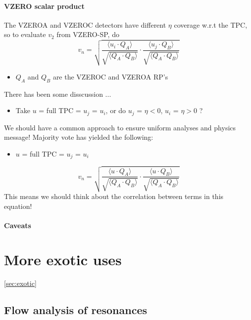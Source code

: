 \documentclass[a4paper]{book}
\numberwithin{equation}{subsection}
\begin{document}
		\subsubsection{VZERO scalar product}
		
The VZEROA and VZEROC detectors have different $\eta$ coverage w.r.t the TPC, so to evaluate $v_2$ from VZERO-SP, do
\begin{equation}
v_n = \sqrt{\frac{\langle u_i \cdotp Q_A \rangle }{\sqrt{\langle Q_A \cdotp Q_B \rangle}} \cdotp \frac{\langle u_j \cdotp Q_B \rangle }{\sqrt{\langle Q_A \cdotp Q_B \rangle}}}
\nonumber
\end{equation}
\begin{itemize}
\item $Q_A$ and $Q_B$ are the VZEROC and VZEROA RP's
\end{itemize}
There has been some disscussion ...
\begin{itemize}
\item Take $u$ = full TPC = $u_j$ = $u_i$, or do $u_j$ = $\eta < 0$, $u_i$ = $\eta > 0$ ?
\end{itemize}
We should have a common approach to ensure uniform analyses and physics message!
Majority vote has yielded the following:
\begin{itemize}
\item $u$ = full TPC = $u_j$ = $u_i$
\end{itemize}
\begin{equation}
v_n = \sqrt{\frac{\langle u \cdotp Q_A \rangle }{\sqrt{\langle Q_A \cdotp Q_B \rangle}} \cdotp \frac{\langle u \cdotp Q_B \rangle }{\sqrt{\langle Q_A \cdotp Q_B \rangle}}}
\nonumber
\end{equation}
This means we should think about the \alert{correlation} between terms in this equation!
	\subsubsection{Caveats}
		
		
\chapter{More exotic uses}\ref{sec:exotic}
\section{Flow analysis of resonances}	
\end{document}
